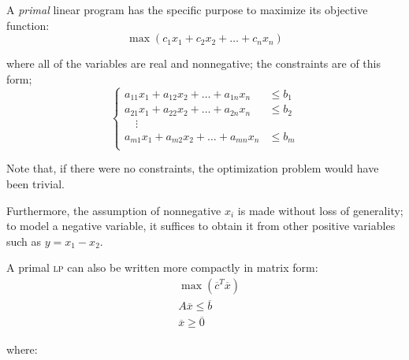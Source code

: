 \begin{definition}\label{def:lpprimal}
    A \emph{primal} linear program has the specific purpose to maximize its objective function:
    \begin{equation*}
        \max(c_1 x_1 + c_2 x_2 + \ldots + c_n x_n)
    \end{equation*}

    where all of the variables are real and nonnegative; the constraints are of this form;
    \begin{equation*}
        \begin{cases}
            a_{1 1} x_1 + a_{1 2} x_2 + \ldots + a_{1 n} x_n &\leq b_1 \\
            a_{2 1} x_1 + a_{2 2} x_2 + \ldots + a_{2 n} x_n &\leq b_2 \\
            \quad \vdots                                     &         \\
            a_{m 1} x_1 + a_{m 2} x_2 + \ldots + a_{m n} x_n &\leq b_m \\
        \end{cases}
    \end{equation*}
\end{definition}

Note that, if there were no constraints, the optimization problem would have been trivial.

Furthermore, the assumption of nonnegative $x_i$ is made without loss of generality; to model a negative variable, it suffices to obtain it from other positive variables such as $y = x_1 - x_2$.

A primal \textsc{lp} can also be written more compactly in matrix form:
\begin{equation}\label{primal-matrix}
    \begin{aligned}
        &\max(\overline{c}^T \overline{x}) \\
        &A \overline{x} \leq \overline{b} \\
        &\overline{x} \geq \overline{0}
    \end{aligned}
\end{equation}


where:

